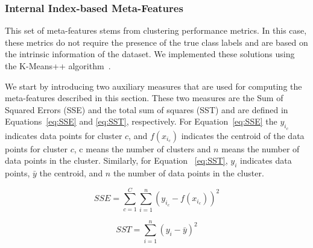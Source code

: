 \documentclass{article}
\begin{document}
\subsubsection{Internal Index-based Meta-Features}
This set of meta-features stems from clustering performance metrics. In this case, these metrics do not require the presence of the true class labels and are based on the intrinsic information of the dataset. We implemented these solutions using the K-Means++ algorithm~\cite{arthurKmeansAdvantagesCareful2007}.

We start by introducing two auxiliary measures that are used for computing the meta-features described in this section. These two measures are the Sum of Squared Errors (SSE) and the total sum of squares (SST) and are defined in Equations~\autoref{eq:SSE} and \autoref{eq:SST}, respectively. For Equation~\autoref{eq:SSE} the $y_{i_c}$ indicates data points for cluster $c$, and $f(x_{i_c})$ indicates the centroid of the data points for cluster $c$, c means the number of clusters and $n$ means the number of data points in the cluster. Similarly, for Equation~ \autoref{eq:SST},  $y_i$ indicates data points, $\bar{y}$ the centroid, and $n$ the number of data points in the cluster. %

\begin{equation}\label{eq:SSE}
SSE =  \sum \limits_{c=1}^{C} \sum \limits_{i=1}^{n} (y_{i_c}-f(x_{i_c}))^2
\end{equation}

\begin{equation}\label{eq:SST}
SST =\sum_{i=1}^{n}(y_{i}-\bar{y})^{2}
\end{equation}
\end{document}
